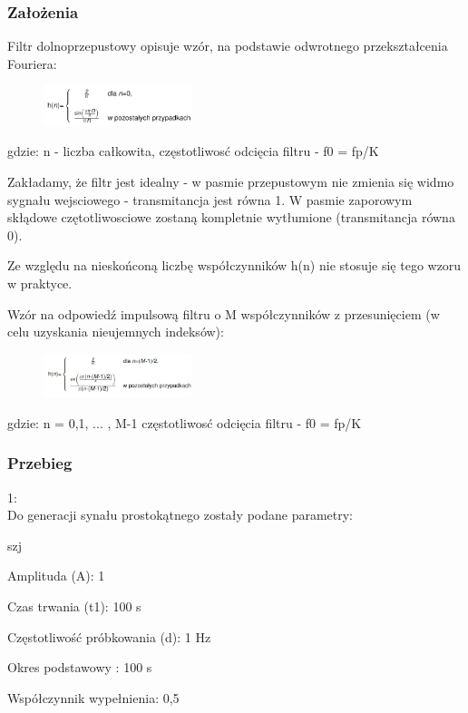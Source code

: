 \documentclass[12pt]{article}
\begin{document}
\subsubsection{Założenia}
Filtr dolnoprzepustowy opisuje wzór, na podstawie odwrotnego przekształcenia Fouriera:

\begin{figure}[h!]
 \centering
 \includegraphics[width=4.3cm]{four.PNG}
 \vspace{-0.3cm}
 \label{gw}
\end{figure}

gdzie:
\subitem n - liczba całkowita,
\subitem częstotliwosć odcięcia filtru - f0 =  fp/K

Zakładamy, że filtr jest idealny -  w pasmie przepustowym nie zmienia się widmo sygnału wejsciowego -  transmitancja jest równa  1. W pasmie zaporowym skłądowe czętotliwosciowe zostaną kompletnie wytłumione (transmitancja równa 0).

Ze względu na nieskońconą liczbę współczynników h(n) nie stosuje się tego wzoru w praktyce.

Wzór na odpowiedź impulsową filtru o M współczynników z przesunięciem (w celu uzyskania nieujemnych indeksów):

\begin{figure}[h!]
 \centering
 \includegraphics[width=4.3cm]{f.PNG}
 \vspace{-0.3cm}
 \label{gw}
\end{figure}

gdzie:
\subitem n = 0,1, ... , M-1
\subitem częstotliwosć odcięcia filtru - f0 =  fp/K

\subsubsection{Przebieg}
1:
\\Do generacji synału prostokątnego zostały podane parametry:

\begin{labeling}{szj}
\item [Amplituda (A):] 1
\item [Czas trwania (t1):] 100 s
\item [Częstotliwość próbkowania (d): ] 1 Hz
\item [Okres podstawowy :] 100 s
\item [Współczynnik wypełnienia:] 0,5
\end{labeling}
\end{document}
